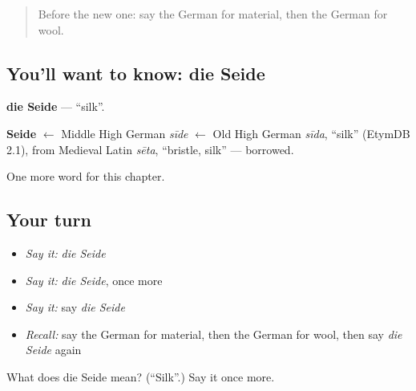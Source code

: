 \label{lesson:GE-C203-seide}



\begin{quote}
Before the new one: say the German for material, then the German for wool.
\end{quote}

\subsection*{You'll want to know: die Seide}
\textbf{die Seide} — \textquotedblleft{}silk\textquotedblright{}.

\begin{cousinweb}
\textbf{Seide} $\leftarrow$ Middle High German \emph{sīde} $\leftarrow$ Old High German \emph{sīda}, \textquotedblleft{}silk\textquotedblright{} (EtymDB 2.1), from Medieval Latin \emph{sēta}, \textquotedblleft{}bristle, silk\textquotedblright{} — borrowed.
\end{cousinweb}

\begin{grammarlens}[title={What you've built}]
One more word for this chapter.
\end{grammarlens}

\subsection*{Your turn}
\begin{itemize}
\raggedright
  \item \emph{Say it:} \emph{die Seide}
  \item \emph{Say it:} \emph{die Seide}, once more
  \item \emph{Say it:} say \emph{die Seide}
  \item \emph{Recall:} say the German for material, then the German for wool, then say \emph{die Seide} again
\end{itemize}

\begin{tcolorbox}[breakable,colback=teal!4,colframe=teal!35!black,title={Before you move on}]
What does die Seide mean? (\textquotedblleft{}Silk\textquotedblright{}.) Say it once more.
\end{tcolorbox}
